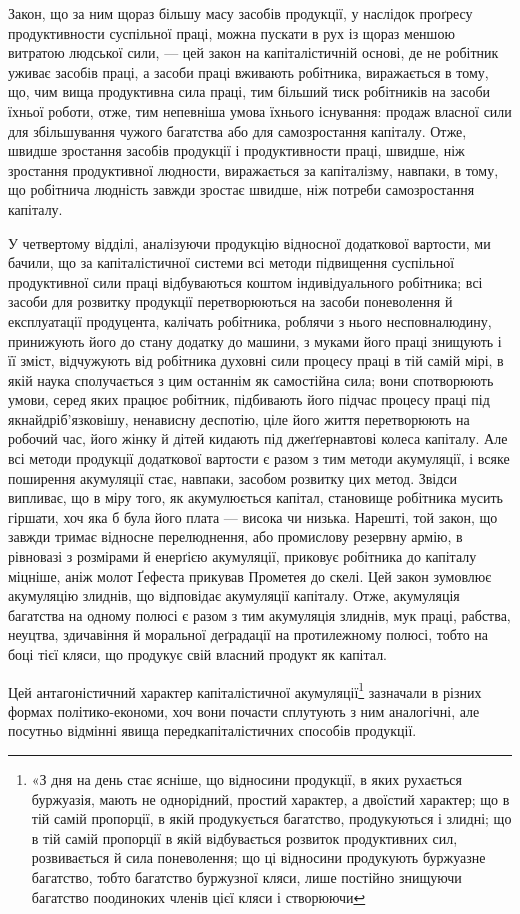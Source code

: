 Закон, що за ним щораз більшу масу засобів продукції, у
наслідок проґресу продуктивности суспільної праці, можна пускати
в рух із щораз меншою витратою людської сили, — цей
закон на капіталістичній основі, де не робітник уживає засобів
праці, а засоби праці вживають робітника, виражається в тому,
що, чим вища продуктивна сила праці, тим більший тиск робітників
на засоби їхньої роботи, отже, тим непевніша умова їхнього
існування: продаж власної сили для збільшування чужого багатства
або для самозростання капіталу. Отже, швидше зростання
засобів продукції і продуктивности праці, швидше, ніж
зростання продуктивної людности, виражається за капіталізму,
навпаки, в тому, що робітнича людність завжди зростає швидше,
ніж потреби самозростання капіталу.

У четвертому відділі, аналізуючи продукцію відносної додаткової
вартости, ми бачили, що за капіталістичної системи всі
методи підвищення суспільної продуктивної сили праці відбуваються
коштом індивідуального робітника; всі засоби для розвитку
продукції перетворюються на засоби поневолення й експлуатації
продуцента, калічать робітника, роблячи з нього несповналюдину,
принижують його до стану додатку до машини, з муками
його праці знищують і її зміст, відчужують від робітника духовні
сили процесу праці в тій самій мірі, в якій наука сполучається
з цим останнім як самостійна сила; вони спотворюють умови, серед
яких працює робітник, підбивають його підчас процесу праці
під якнайдріб’язковішу, ненависну деспотію, ціле його життя
перетворюють на робочий час, його жінку й дітей кидають під
джеґґернавтові колеса капіталу. Але всі методи продукції додаткової
вартости є разом з тим методи акумуляції, і всяке поширення
акумуляції стає, навпаки, засобом розвитку цих метод.
Звідси випливає, що в міру того, як акумулюється капітал,
становище робітника мусить гіршати, хоч яка б була його плата —
висока чи низька. Нарешті, той закон, що завжди тримає відносне
перелюднення, або промислову резервну армію, в рівновазі
з розмірами й енерґією акумуляції, приковує робітника до капіталу
міцніше, аніж молот Ґефеста прикував Прометея до скелі.
Цей закон зумовлює акумуляцію злиднів, що відповідає акумуляції
капіталу. Отже, акумуляція багатства на одному полюсі
є разом з тим акумуляція злиднів, мук праці, рабства, неуцтва,
здичавіння й моральної деґрадації на протилежному полюсі,
тобто на боці тієї кляси, що продукує свій власний продукт як
капітал.

Цей антагоністичний характер капіталістичної акумуляції\footnote{
«З дня на день стає ясніше, що відносини продукції, в яких
рухається буржуазія, мають не однорідний, простий характер, а двоїстий
характер; що в тій самій пропорції, в якій продукується багатство,
продукуються і злидні; що в тій самій пропорції в якій відбувається розвиток
продуктивних сил, розвивається й сила поневолення; що ці відносини
продукують буржуазне багатство, тобто багатство буржузної кляси, лише
постійно знищуючи багатство поодиноких членів цієї кляси і створюючи
}
зазначали в різних формах політико-економи, хоч вони почасти
сплутують з ним аналогічні, але посутньо відмінні явища передкапіталістичних
способів продукції.


